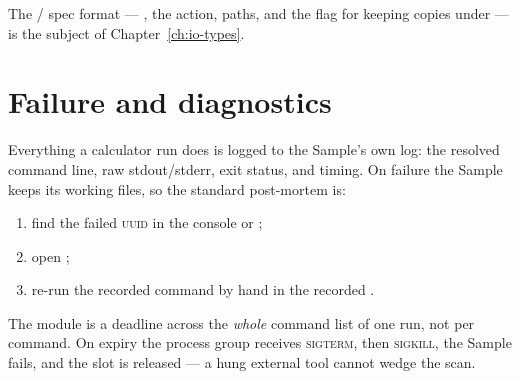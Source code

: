 The / spec format --- , the 
action,  paths, and the  flag for keeping copies under
 --- is the subject of Chapter~\ref{ch:io-types}.

\section{Failure and diagnostics}
\label{sec:calc-failure}

Everything a calculator run does is logged to the Sample's own log: the resolved
command line, raw stdout/stderr, exit status, and timing. On failure the Sample keeps
its working files, so the standard post-mortem is:

\begin{enumerate}
  \item find the failed \textsc{uuid} in the console or ;
  \item open ;
  \item re-run the recorded command by hand in the recorded .
\end{enumerate}

\begin{jnote}
The module  is a deadline across the \emph{whole} command list of one
run, not per command. On expiry the process group receives \textsc{sigterm}, then
\textsc{sigkill}, the Sample fails, and the slot is released --- a hung external tool
cannot wedge the scan.
\end{jnote}
